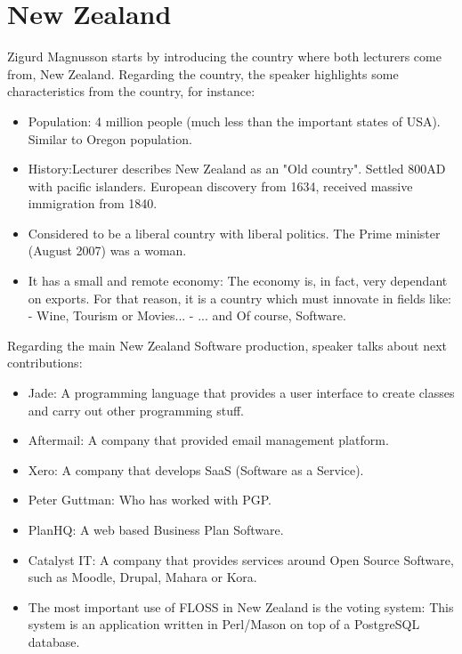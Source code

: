 \documentclass[11pt]{article}
\begin{document}
\section{New Zealand}
Zigurd Magnusson starts by introducing the country where both lecturers come from, New Zealand. Regarding the country, the speaker highlights some characteristics from the country, for instance:
\begin{itemize}\itemsep0pt
\item{Population}: 4 million people (much less than the important states of USA). Similar to Oregon population.
\item{History}:Lecturer describes New Zealand as an "Old country". Settled 800AD with pacific islanders. European discovery from 1634, received massive immigration from 1840.
\item{Considered to be a liberal country with liberal politics}. The Prime minister (August 2007) was a woman.
\item{It has a small and remote economy}: The economy is, in fact, very dependant on exports. For that reason, it is a country which must innovate in fields like:
    - Wine, Tourism or Movies...
    - ... and Of course, Software.
\end{itemize}
Regarding the main New Zealand Software production, speaker talks about next contributions:
\begin{itemize}\itemsep0pt
\item{Jade}: A programming language that provides a user interface to create classes and carry out other programming stuff.
\item{Aftermail}: A company that provided email management platform.
\item{Xero}: A company that develops SaaS (Software as a Service).
\item{Peter Guttman}: Who has worked with PGP.
\item{PlanHQ}: A web based Business Plan Software.
\item{Catalyst IT}: A company that provides services around Open Source Software, such as Moodle, Drupal, Mahara or Kora.
\item{The most important use of FLOSS in New Zealand is the voting system}: This system is an application written in Perl/Mason on top of a PostgreSQL database.
\end{itemize}
\end{document}

